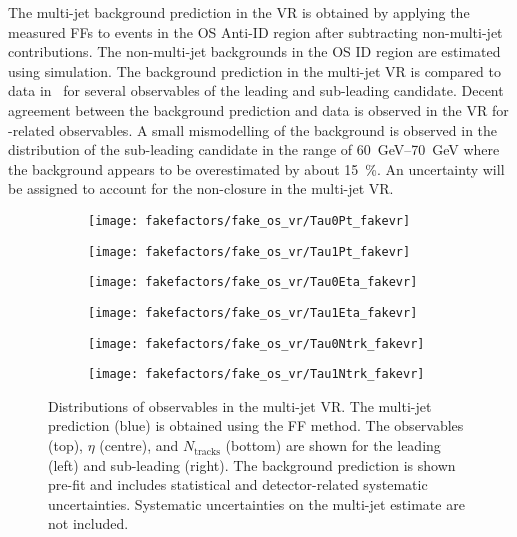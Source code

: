 The multi-jet background prediction in the VR is obtained by applying the
measured FFs to events in the OS Anti-ID region after subtracting non-multi-jet
contributions. The non-multi-jet backgrounds in the OS ID region are estimated
using simulation. The background prediction in the multi-jet VR is compared to
data in~ for several observables of the
leading and sub-leading \tauhadvis candidate. Decent agreement between the
background prediction and data is observed in the VR for \tauhadvis-related
observables. A small mismodelling of the background is observed in the \pT
distribution of the sub-leading \tauhadvis candidate in the range of
\SIrange{60}{70}{\GeV} where the background appears to be overestimated by about
\SI{15}{\percent}. An uncertainty will be assigned to account for the
non-closure in the multi-jet VR.

\begin{figure}[htbp]
  \centering

  \begin{subfigure}{0.44\textwidth}
    \texttt{[image: fakefactors/fake\_os\_vr/Tau0Pt\_fakevr]}
  \end{subfigure}\hspace*{0.04\textwidth}%
  \begin{subfigure}{0.44\textwidth}
    \texttt{[image: fakefactors/fake\_os\_vr/Tau1Pt\_fakevr]}
  \end{subfigure}

  \begin{subfigure}{0.44\textwidth}
    \texttt{[image: fakefactors/fake\_os\_vr/Tau0Eta\_fakevr]}
  \end{subfigure}\hspace*{0.04\textwidth}%
  \begin{subfigure}{0.44\textwidth}
    \texttt{[image: fakefactors/fake\_os\_vr/Tau1Eta\_fakevr]}
  \end{subfigure}

  \begin{subfigure}{0.44\textwidth}
    \texttt{[image: fakefactors/fake\_os\_vr/Tau0Ntrk\_fakevr]}
  \end{subfigure}\hspace*{0.04\textwidth}%
  \begin{subfigure}{0.44\textwidth}
    \texttt{[image: fakefactors/fake\_os\_vr/Tau1Ntrk\_fakevr]}
  \end{subfigure}

  \caption[Distributions of \tauhadvis observables in the multi-jet
  VR.]{Distributions of \tauhadvis observables in the multi-jet VR. The
    multi-jet prediction (blue) is obtained using the FF method. The \tauhadvis
    observables \pT (top), $\eta$ (centre), and $N_{\text{tracks}}$ (bottom) are
    shown for the leading (left) and sub-leading \tauhadvis (right). The
    background prediction is shown pre-fit and includes statistical and
    detector-related systematic uncertainties. Systematic uncertainties on
    the multi-jet estimate are not included.}%
  \label{fig:fake_factor_OSVR_kinematics}
\end{figure}

